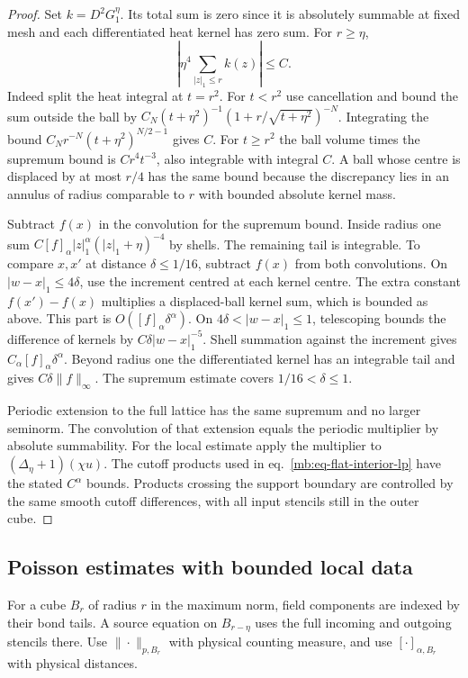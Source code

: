 \documentclass[11pt,letterpaper,reqno]{amsart}
\numberwithin{equation}{section}
\renewcommand{\eqref}[1]{\textup{eq.~\ref{#1}}}
\theoremstyle{definition}
\theoremstyle{remark}
\begin{document}
\begin{proof}
Set \(k=D^2G_1^\eta\). Its total sum is zero since it is absolutely
summable at fixed mesh and each differentiated heat kernel has
zero sum. For \(r\ge\eta\),
\[
 \left|\eta^4\sum_{|z|_1\le r} k(z)\right|\le C .
\]
Indeed split the heat integral at \(t=r^2\). For \(t<r^2\)
use cancellation and bound the sum outside the ball by
\(C_N(t+\eta^2)^{-1}(1+r/\sqrt{t+\eta^2})^{-N}\).
Integrating the bound \(C_Nr^{-N}(t+\eta^2)^{N/2-1}\) gives \(C\).
For \(t\ge r^2\) the ball volume times the supremum bound is
\(Cr^4t^{-3}\), also integrable with integral \(C\).
A ball whose centre is displaced by at most \(r/4\) has the
same bound because the discrepancy lies in an annulus of radius
comparable to \(r\) with bounded absolute kernel mass.

Subtract \(f(x)\) in the convolution for the supremum bound.
Inside radius one sum \(C[f]_\alpha |z|_1^\alpha
(|z|_1+\eta)^{-4}\) by shells. The remaining tail is integrable.
To compare \(x,x'\) at distance \(\delta\le1/16\), subtract
\(f(x)\) from both convolutions. On \(|w-x|_1\le4\delta\),
use the increment centred at each kernel centre. The extra
constant \(f(x')-f(x)\) multiplies a displaced-ball kernel sum,
which is bounded as above. This part is \(O([f]_\alpha\delta^\alpha)\).
On \(4\delta<|w-x|_1\le1\), telescoping bounds the difference of
kernels by \(C\delta |w-x|_1^{-5}\). Shell summation
against the increment gives \(C_\alpha[f]_\alpha\delta^\alpha\).
Beyond radius one the differentiated kernel has an integrable
tail and gives \(C\delta\|f\|_\infty\). The supremum estimate
covers \(1/16<\delta\le1\).

Periodic extension to the full lattice has the same supremum
and no larger seminorm. The convolution of that extension equals
the periodic multiplier by absolute summability. For the local
estimate apply the multiplier to \((\Delta_\eta+1)(\chi u)\).
The cutoff products used in \eqref{mb:eq-flat-interior-lp} have
the stated \(C^\alpha\) bounds. Products crossing the support
boundary are controlled by the same smooth cutoff differences,
with all input stencils still in the outer cube.
\end{proof}

\subsection{Poisson estimates with bounded local data}

For a cube \(B_r\) of radius \(r\) in the maximum norm, field
components are indexed by their bond tails. A source equation
on \(B_{r-\eta}\) uses the full incoming and outgoing stencils
there. Use \(\|\cdot\|_{p,B_r}\) with physical counting measure,
and use \([\cdot]_{\alpha,B_r}\) with physical distances.
\end{document}
